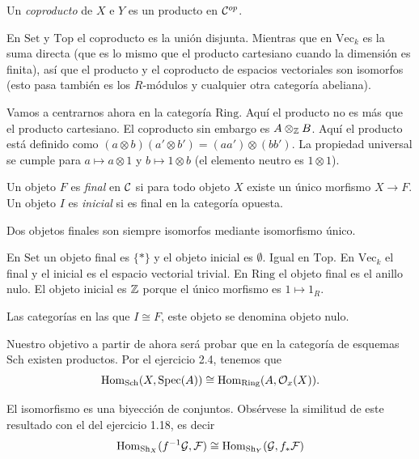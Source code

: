 \documentclass[GA.tex]{subfiles}
\begin{document}
\begin{defi}
Un \emph{coproducto} de $X$ e $Y$ es un producto en $\mathcal{C}^{op}$. 
\end{defi}
\begin{defi}
En $\mathrm{Set}$ y $\mathrm{Top}$ el coproducto es la unión disjunta. Mientras que en $\mathrm{Vec}_k$ es la suma directa (que es lo mismo que el producto cartesiano cuando la dimensión es finita), así que el producto y el coproducto de espacios vectoriales son isomorfos (esto pasa también es los $R$-módulos y cualquier otra categoría abeliana). 
\end{defi}

Vamos a centrarnos ahora en la categoría $\mathrm{Ring}$. Aquí el producto no es más que el producto cartesiano. El coproducto sin embargo es $A\otimes_{\mathbb{Z}} B$. Aquí el producto está definido como $(a\otimes b)(a'\otimes b')=(aa')\otimes (bb')$. La propiedad universal se cumple para $a\mapsto a\otimes 1$ y $b\mapsto 1\otimes b$ (el elemento neutro es $1\otimes 1$). 

\begin{defi}
Un objeto $F$ es \emph{final} en $\mathcal{C}$ si para todo objeto $X$ existe un único morfismo $X\to F$. Un objeto $I$ es \emph{inicial} si es final en la categoría opuesta.
\end{defi}
Dos objetos finales son siempre isomorfos mediante isomorfismo único.

\begin{ej}
En $\mathrm{Set}$ un objeto final es $\{*\}$ y el objeto inicial es $\emptyset$. Igual en $\mathrm{Top}$. En $\mathrm{Vec}_k$ el final y el inicial es el espacio vectorial trivial. En $\mathrm{Ring}$ el objeto final es el anillo nulo. El objeto inicial es $\mathbb{Z}$ porque el único morfismo es $1\mapsto 1_R$. 
\end{ej}

Las categorías en las que $I\cong F$, este objeto se denomina objeto nulo. 

Nuestro objetivo a partir de ahora será probar que en la categoría de esquemas $\mathrm{Sch}$ existen productos. Por el ejercicio 2.4, tenemos que
\[
\operatorname{Hom}_{\mathrm{Sch}}(X,\operatorname{Spec}(A))\cong\operatorname{Hom}_{\mathrm{Ring}}(A,{\mathcal O}_x(X)).
\]

El isomorfismo es una biyección de conjuntos. Obsérvese la similitud de este resultado con el del ejercicio 1.18, es decir
\[
\operatorname{Hom}_{\mathrm{Sh}_X}(f^{-1}\mathcal{G},\mathcal{F})\cong \operatorname{Hom}_{\mathrm{Sh}_Y}(\mathcal{G}, f_*\mathcal{F})
\] 
\end{document}

